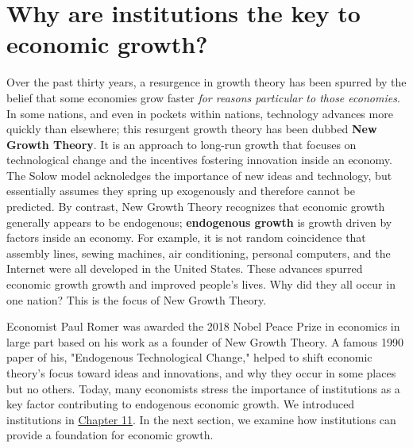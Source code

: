 \documentclass[11pt]{article} %
\begin{document}
\section*{\textbf{Why are institutions the key to economic growth?}}
Over the past thirty years, a resurgence in growth theory has been spurred by the belief that some economies grow faster \textit{for reasons particular to those economies}. In some nations, and even in pockets within nations, technology advances more quickly than elsewhere; this resurgent growth theory has been dubbed \textbf{New Growth Theory}. It is an approach to long-run growth that focuses on technological change and the incentives fostering innovation inside an economy. The Solow model acknoledges the importance of new ideas and technology, but essentially assumes they spring up exogenously and therefore cannot be predicted. By contrast, New Growth Theory recognizes that economic growth generally appears to be endogenous; \textbf{endogenous growth} is growth driven by factors inside an economy. For example, it is not random coincidence that assembly lines, sewing machines, air conditioning, personal computers, and the Internet were all developed in the United States. These advances spurred economic growth growth and improved people's lives. Why did they all occur in one nation? This is the focus of New Growth Theory.

Economist Paul Romer was awarded the 2018 Nobel Peace Prize in economics in large part based on his work as a founder of New Growth Theory. A famous 1990 paper of his, "Endogenous Technological Change," helped to shift economic theory's focus toward ideas and innovations, and why they occur in some places but no others. Today, many economists stress the importance of institutions as a key factor contributing to endogenous economic growth. We introduced institutions in \underline{Chapter 11}. In the next section, we examine how institutions can provide a foundation for economic growth.
\end{document}

